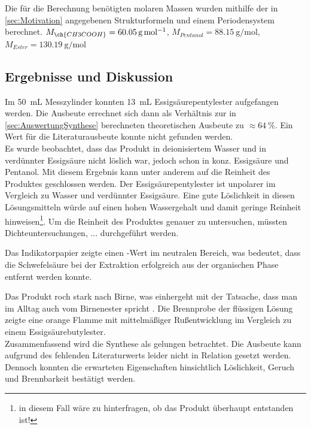 \documentclass{article}
\begin{document}
      Die für die Berechnung benötigten molaren Massen wurden mithilfe der in \ref{sec:Motivation} angegebenen Strukturformeln und einem Periodensystem berechnet. $M_{\ch{CH3COOH}} = \SI[mode=text]{60.05}{\gram\per\mole}$, $M_{Pentanol} = \SI[mode=text]{88.15}{\gram\per\mole}$, $M_{Ester} = \SI[mode=text]{130.19}{\gram\per\mole}$
      
     
    \subsection{Ergebnisse und Diskussion}
      
      Im \SI[mode=text]{50}{\milli\liter} Messzylinder konnten \SI[mode=text]{13}{\milli\liter} Essigsäurepentylester aufgefangen werden. Die Ausbeute errechnet sich dann als Verhältnis zur in \ref{sec:AuswertungSynthese} berechneten theoretischen Ausbeute zu $\approx \SI[mode=text]{64}{\percent}$. Ein Wert für die Literaturausbeute konnte nicht gefunden werden.  \\
      
      Es wurde beobachtet, dass das Produkt in deionisiertem Wasser und in verdünnter Essigsäure nicht löslich war, jedoch schon in konz. Essigsäure und Pentanol. Mit diesem Ergebnis kann unter anderem auf die Reinheit des Produktes geschlossen werden. Der Essigsäurepentylester ist unpolarer im Vergleich zu Wasser und verdünnter Essigsäure. Eine gute Löslichkeit in diesen Lösungsmitteln würde auf einen hohen Wassergehalt und damit geringe Reinheit hinweisen\footnote{in diesem Fall wäre zu hinterfragen, ob das Produkt überhaupt entstanden ist!}. Um die Reinheit des Produktes genauer zu untersuchen, müssten Dichteuntersuchungen, ... durchgeführt werden. 
      
      Das Indikatorpapier zeigte einen \pH-Wert im neutralen Bereich, was bedeutet, dass die Schwefelsäure bei der Extraktion erfolgreich aus der organischen Phase entfernt werden konnte.
      
      Das Produkt roch stark nach Birne, was einhergeht mit der Tatsache, dass man im Alltag auch vom Birnenester spricht \cite{Essigsaurepentyl}. Die Brennprobe der flüssigen Lösung zeigte eine orange Flamme mit mittelmäßiger Rußentwicklung im Vergleich zu einem Essigsäurebutylester. \\
      
      Zusammenfassend wird die Synthese als gelungen betrachtet. Die Ausbeute kann aufgrund des fehlenden Literaturwerts leider nicht in Relation gesetzt werden. Dennoch konnten die erwarteten Eigenschaften hinsichtlich Löslichkeit, Geruch und Brennbarkeit bestätigt werden. \\
      
\end{document}

